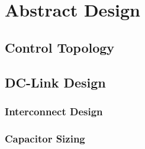 \chapter{Abstract Design}

\section{Control Topology}

\section{DC-Link Design}

\subsection{Interconnect Design}

\subsection{Capacitor Sizing}
